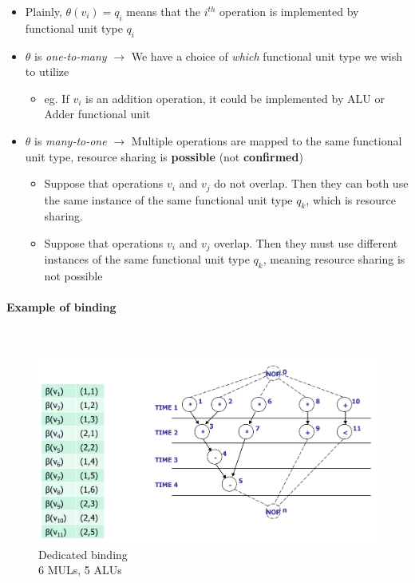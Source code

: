\documentclass{article}
\begin{document}
\begin{enumerate}
        \begin{itemize}
            \item Plainly, $\theta(v_{i}) = q_{i}$ means that the $i^{th}$ operation is implemented by functional unit type $q_{i}$
            \item $\theta$ is \textit{one-to-many} $\longrightarrow$ We have a choice of \textit{which} functional unit type we wish to utilize
                \begin{itemize}
                    \item eg. If $v_{i}$ is an addition operation, it could be implemented by ALU or Adder functional unit
                \end{itemize}
            \item $\theta$ is \textit{many-to-one} $\longrightarrow$ Multiple operations are mapped to the same functional unit type, resource sharing is \textbf{possible} (not \textbf{confirmed})
                \begin{itemize}
                    \item Suppose that operations $v_{i}$ and $v_{j}$ do not overlap. Then they can both use the same instance of the same functional unit type $q_{k}$, which is resource sharing.
                    \item Suppose that operations $v_{i}$ and $v_{j}$ overlap. Then they must use different instances of the same functional unit type $q_{k}$, meaning resource sharing is not possible
                \end{itemize}
        \end{itemize}
\end{enumerate}

\paragraph{Example of binding}\mbox{}\\
\begin{figure}[htp]
    \centering
    \includegraphics[width=12cm, scale=1]{S2/binding1.PNG}
    \caption{Dedicated binding\\
            6 MULs, 5 ALUs}
\end{figure}
\end{document}

